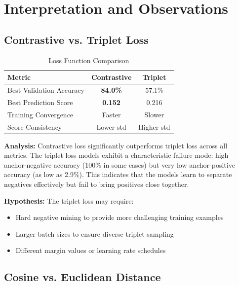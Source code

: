 \documentclass[12pt,a4paper]{article}
\begin{document}
\section{Interpretation and Observations}
\label{sec:interpretation}

\subsection{Contrastive vs. Triplet Loss}

\begin{table}[H]
\centering
\caption{Loss Function Comparison}
\label{tab:loss_comparison}
\begin{tabular}{lcc}
\toprule
\textbf{Metric} & \textbf{Contrastive} & \textbf{Triplet} \\
\midrule
Best Validation Accuracy & \textbf{84.0\%} & 57.1\% \\
Best Prediction Score & \textbf{0.152} & 0.216 \\
Training Convergence & Faster & Slower \\
Score Consistency & Lower std & Higher std \\
\bottomrule
\end{tabular}
\end{table}

\textbf{Analysis:} Contrastive loss significantly outperforms triplet loss across all metrics. The triplet loss models exhibit a characteristic failure mode: high anchor-negative accuracy (100\% in some cases) but very low anchor-positive accuracy (as low as 2.9\%). This indicates that the models learn to separate negatives effectively but fail to bring positives close together.

\textbf{Hypothesis:} The triplet loss may require:
\begin{itemize}
    \item Hard negative mining to provide more challenging training examples
    \item Larger batch sizes to ensure diverse triplet sampling
    \item Different margin values or learning rate schedules
\end{itemize}

\subsection{Cosine vs. Euclidean Distance}
\end{document}
